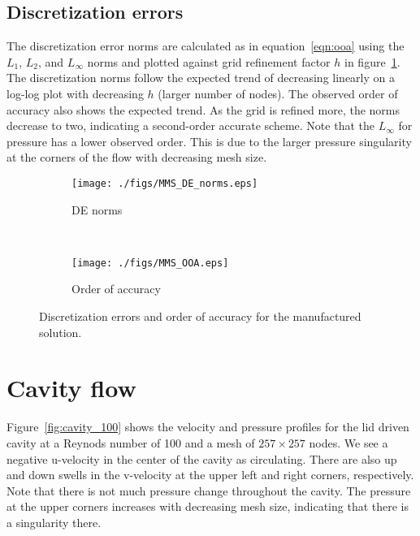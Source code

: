 \documentclass[10pt, letterpaper]{article}
\newcommand{\fig}[1]{figure~\ref{#1}}
\newcommand{\eqn}[1]{equation~\eqref{#1}}
\newcommand{\mesh}[1]{${#1} \times {#1}$}
\begin{document}

\subsection{Discretization errors}

The discretization error norms are calculated as in \eqn{eqn:ooa} using
the $L_1$, $L_2$, and $L_\infty$ norms and plotted against grid refinement 
factor $h$ in \fig{fig:MMS_accuracy}.  The discretization norms follow the expected
trend of decreasing linearly on a log-log plot with decreasing $h$ 
(larger number of nodes).
The observed order of accuracy also shows the expected trend.  As the
grid is refined more, the norms decrease to two, indicating a second-order
accurate scheme.  Note that the $L_\infty$ for pressure has a lower observed order.
This is due to the larger pressure singularity at the corners of the flow
with decreasing mesh size.

\begin{figure}
	\centering
	\begin{subfigure}[b]{0.475\textwidth}
		\centering
		\texttt{[image: ./figs/MMS\_DE\_norms.eps]}
		\caption{DE norms}
	\end{subfigure}
	~
	\begin{subfigure}[b]{0.475\textwidth}
		\centering
		\texttt{[image: ./figs/MMS\_OOA.eps]}
		\caption{Order of accuracy}
	\end{subfigure}
	\caption{Discretization errors and order of accuracy for the manufactured
		solution.}
	\label{fig:MMS_accuracy}
\end{figure}


\newpage

\section{Cavity flow}

Figure~\ref{fig:cavity_100} shows the velocity and pressure profiles for the
lid driven cavity at a Reynods number of 100 and a mesh of \mesh{257} nodes.
We see a negative u-velocity in the center of the cavity as circulating.  There
are also up and down swells in the v-velocity at the upper left and right corners,
respectively.  Note that there is not much pressure change throughout the
cavity.  The pressure at the upper corners increases with decreasing mesh size,
indicating that there is a singularity there.
\end{document}
